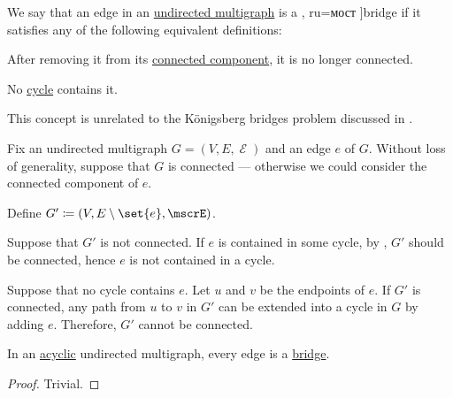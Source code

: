 \begin{definition}\label{def:graph_bridge}
  We say that an edge in an \hyperref[def:hypergraph/multigraph]{undirected multigraph} is a \term[bg=мост (\cite[134]{Мирчев2001}, ru=мост \cite[\S 8.1.2]{Новиков2013}]{bridge} if it satisfies any of the following equivalent definitions:
  \begin{thmenum}
     After removing it from its \hyperref[def:graph_connected_component]{connected component}, it is no longer connected.

     No \hyperref[def:graph_cycle]{cycle} contains it.
  \end{thmenum}
\end{definition}
\begin{comments}
  \item This concept is unrelated to the K\"onigsberg bridges problem discussed in .
\end{comments}
\begin{defproof}
  Fix an undirected multigraph \( G = (V, E, \mscrE) \) and an edge \( e \) of \( G \). Without loss of generality, suppose that \( G \) is connected --- otherwise we could consider the connected component of \( e \).

  Define \( G' \coloneqq (V, E \setminus \set{ e }, \mscrE) \).

   Suppose that \( G' \) is not connected. If \( e \) is contained in some cycle, by , \( G' \) should be connected, hence \( e \) is not contained in a cycle.

   Suppose that no cycle contains \( e \). Let \( u \) and \( v \) be the endpoints of \( e \). If \( G' \) is connected, any path from \( u \) to \( v \) in \( G' \) can be extended into a cycle in \( G \) by adding \( e \). Therefore, \( G' \) cannot be connected.
\end{defproof}

\begin{proposition}\label{thm:acyclic_bridges}
  In an \hyperref[def:acyclic_graph]{acyclic} undirected multigraph, every edge is a \hyperref[def:graph_bridge]{bridge}.
\end{proposition}
\begin{proof}
  Trivial.
\end{proof}

